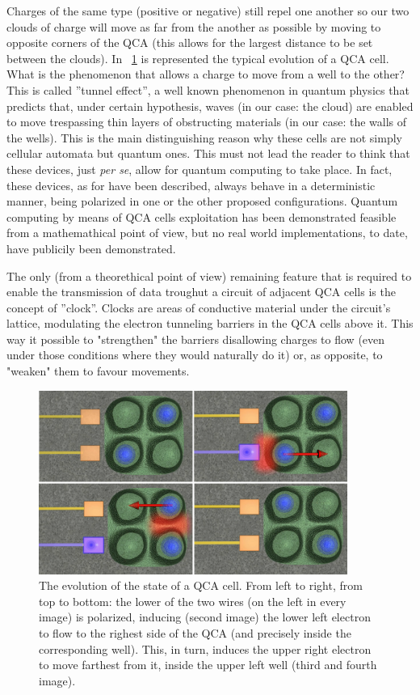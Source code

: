 Charges of the same type (positive or negative) still repel one another so our two clouds of charge will move as far from the another as possible by moving to opposite corners of the QCA (this allows for the largest distance to be set between the clouds). In \figurename~\ref{fig:qcaevo} is represented the typical evolution of a QCA cell. What is the phenomenon that allows a charge to move from a well to the other? This is called ''tunnel effect'', a well known phenomenon in quantum physics that predicts that, under certain hypothesis, waves (in our case: the cloud) are enabled to move trespassing thin layers of obstructing materials (in our case: the walls of the wells). This is the main distinguishing reason why these cells are not simply cellular automata but quantum ones. This must not lead the reader to think that these devices, just \textsl{per se}, allow for quantum computing to take place. In fact, these devices, as for have been described, always behave in a deterministic manner, being polarized in one or the other proposed configurations. Quantum computing by means of QCA cells exploitation has been demonstrated feasible from a mathemathical point of view, but no real world implementations, to date, have publicily been demonstrated.  

The only (from a theorethical point of view) remaining feature that is required to enable the transmission of data troughut a circuit of adjacent QCA cells is the concept of ''clock''. Clocks are areas of conductive material under the circuit's lattice, modulating the electron tunneling barriers in the QCA cells above it. This way it possible to "strengthen" the barriers disallowing charges to flow (even under those conditions where they would naturally do it) or, as opposite, to "weaken" them to favour movements.

\begin{figure}[h!bt]
	\centerline{\includegraphics[width=0.9\textwidth]{img/qcaevo.png}}
	\caption{The evolution of the state of a QCA cell. From left to right, from top to bottom: the lower of the two wires (on the left in every image) is polarized, inducing (second image) the lower left electron to flow to the righest side of the QCA (and precisely inside the corresponding well). This, in turn, induces the upper right electron to move farthest from it, inside the upper left well (third and fourth image).}
	\label{fig:qcaevo}
\end{figure}

